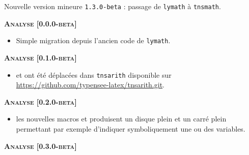 Nouvelle version mineure \verb+1.3.0-beta+ : passage de \verb#lymath# à \verb#tnsmath#.




\begin{center}
    \textbf{\textsc{Analyse [0.0.0-beta]}}
\end{center}

\begin{itemize}[itemsep=.5em]
    \item Simple migration depuis l'ancien code de \verb+lymath+.
\end{itemize}


\begin{center}
    \textbf{\textsc{Analyse [0.1.0-beta]}}
\end{center}

\begin{itemize}[itemsep=.5em]
    \item {}  et  ont été déplacées dans \texttt{tnsarith} disponible sur \url{https://github.com/typensee-latex/tnsarith.git}.
\end{itemize}


\begin{center}
    \textbf{\textsc{Analyse [0.2.0-beta]}}
\end{center}

\begin{itemize}[itemsep=.5em]
    \item {} les nouvelles macros  et  produisent un disque plein et un carré plein permettant par exemple d'indiquer symboliquement une ou des variables.
    
    
\end{itemize}


\begin{center}
    \textbf{\textsc{Analyse [0.3.0-beta]}}
\end{center}

